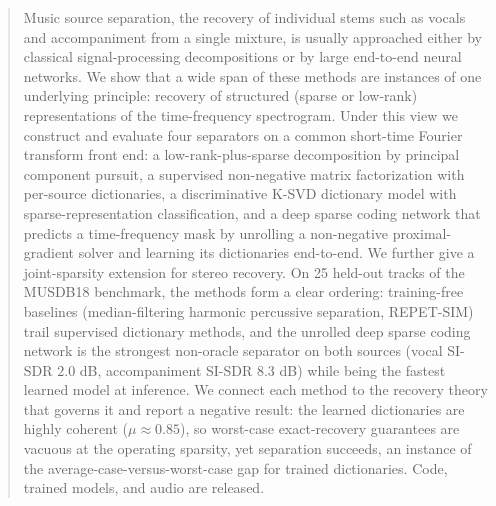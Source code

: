 \documentclass{article}
\begin{document}
\printAffiliationsAndNotice{}

\begin{abstract}
Music source separation, the recovery of individual stems such as vocals and
accompaniment from a single mixture, is usually approached either by classical
signal-processing decompositions or by large end-to-end neural networks. We show
that a wide span of these methods are instances of one underlying principle:
recovery of structured (sparse or low-rank) representations of the time-frequency
spectrogram. Under this view we construct and evaluate four separators on a common
short-time Fourier transform front end: a low-rank-plus-sparse decomposition by
principal component pursuit, a supervised non-negative matrix factorization with
per-source dictionaries, a discriminative K-SVD dictionary model with
sparse-representation classification, and a deep sparse coding network that
predicts a time-frequency mask by unrolling a non-negative proximal-gradient
solver and learning its dictionaries end-to-end. We further give a joint-sparsity
extension for stereo recovery. On 25 held-out tracks of the MUSDB18 benchmark, the
methods form a clear ordering: training-free baselines (median-filtering harmonic
percussive separation, REPET-SIM) trail supervised dictionary methods, and the
unrolled deep sparse coding network is the strongest non-oracle separator on both
sources (vocal SI-SDR $2.0$ dB, accompaniment SI-SDR $8.3$ dB) while being the
fastest learned model at inference. We connect each method to the recovery theory
that governs it and report a negative result: the learned dictionaries are highly
coherent ($\mu\approx0.85$), so worst-case exact-recovery guarantees are vacuous at
the operating sparsity, yet separation succeeds, an instance of the
average-case-versus-worst-case gap for trained dictionaries. Code, trained models,
and audio are released.
\end{abstract}
\end{document}
